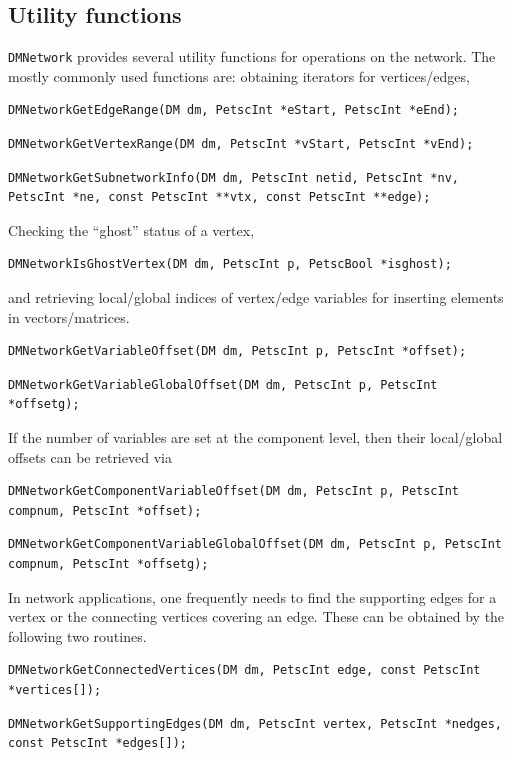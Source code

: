 \subsection{Utility functions}
  \lstinline{DMNetwork} provides several utility functions for operations on the network. The mostly commonly used functions are:
obtaining iterators for vertices/edges,
\begin{lstlisting}
DMNetworkGetEdgeRange(DM dm, PetscInt *eStart, PetscInt *eEnd);
\end{lstlisting}
\begin{lstlisting}
DMNetworkGetVertexRange(DM dm, PetscInt *vStart, PetscInt *vEnd);
\end{lstlisting}
\begin{lstlisting}
DMNetworkGetSubnetworkInfo(DM dm, PetscInt netid, PetscInt *nv, PetscInt *ne, const PetscInt **vtx, const PetscInt **edge);
\end{lstlisting}
Checking the ``ghost'' status of a vertex,
\begin{lstlisting}
DMNetworkIsGhostVertex(DM dm, PetscInt p, PetscBool *isghost);
\end{lstlisting}
and retrieving local/global indices of vertex/edge variables for inserting
  elements in vectors/matrices.
\begin{lstlisting}
DMNetworkGetVariableOffset(DM dm, PetscInt p, PetscInt *offset);
\end{lstlisting}
\begin{lstlisting}
DMNetworkGetVariableGlobalOffset(DM dm, PetscInt p, PetscInt *offsetg);
\end{lstlisting}
If the number of variables are set at the component level, then their local/global offsets can be retrieved via
\begin{lstlisting}
DMNetworkGetComponentVariableOffset(DM dm, PetscInt p, PetscInt compnum, PetscInt *offset);
\end{lstlisting}
\begin{lstlisting}
DMNetworkGetComponentVariableGlobalOffset(DM dm, PetscInt p, PetscInt compnum, PetscInt *offsetg);
\end{lstlisting}
In network applications, one frequently needs to find the supporting edges for a vertex or
the connecting vertices covering an edge. These can be obtained by the following two routines.
\begin{lstlisting}
DMNetworkGetConnectedVertices(DM dm, PetscInt edge, const PetscInt *vertices[]);
\end{lstlisting}
\begin{lstlisting}
DMNetworkGetSupportingEdges(DM dm, PetscInt vertex, PetscInt *nedges, const PetscInt *edges[]);
\end{lstlisting}

